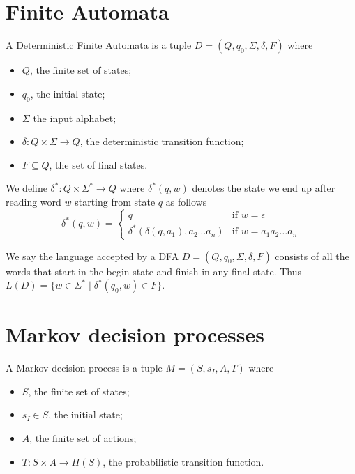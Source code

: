 \section{Finite Automata}

\begin{definition}[DFA]
A Deterministic Finite Automata is a tuple $D=(Q,q_0,\Sigma,\delta,F)$ where 
\begin{itemize}
\item $Q$, the finite set of states;
\item $q_0$, the initial state;
\item $\Sigma$ the input alphabet;
\item $\delta: Q\times\Sigma\to Q$, the deterministic transition function;
\item $F\subseteq Q$, the set of final states.
\end{itemize}
\end{definition}

\begin{definition}
We define $\delta^*:Q\times\Sigma^*\to Q$ where $\delta^*(q,w)$ denotes the state we end up after reading word $w$ starting from state $q$ as follows
\begin{equation*}
\delta^*(q,w)=\begin{cases}
	q &\text{if } w=\epsilon \\
	\delta^*(\delta(q,a_1),a_2\dots a_n) & \text{if } w=a_1a_2\dots a_n
	\end{cases}
\end{equation*}
\label{d:delta_star}
\end{definition}


\begin{definition}
We say the language accepted by a DFA $D=(Q,q_0,\Sigma,\delta,F)$ consists of all the words that start in the begin state and finish in any final state. Thus $L(D)=\{w\in\Sigma^*\mid \delta^*(q_0,w)\in F\}$.
\label{d:accepted_language}
\end{definition}



\section{Markov decision processes}

\begin{definition}[MDP]
	A Markov decision process is a tuple $M=(S,s_I,A,T)$ where 
	\begin{itemize}
		\item $S$, the finite set of states;
		\item $s_I\in S$, the initial state;
		\item $A$, the finite set of actions;
		\item $T:S\times A\to \Pi(S)$, the probabilistic transition function.
	\end{itemize}
\end{definition}

